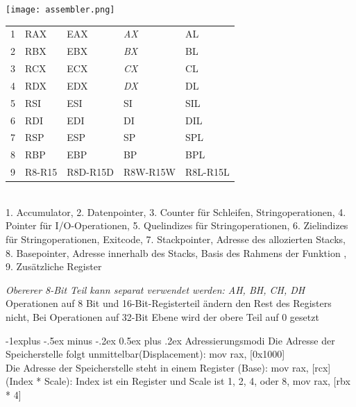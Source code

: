 \documentclass[10pt,landscape,a4paper]{article}
\makeatletter
\renewcommand{\subsection}{\@startsection{subsection}{2}{0mm}%
                                {-1explus -.5ex minus -.2ex}%
                                {0.5ex plus .2ex}%
                                {\normalfont\small\bfseries}}
\makeatother
\begin{document}
\begin{multicols*}{3}
\texttt{[image: assembler.png]}\\
\begin{tabular}{lllll}
1 & RAX     & \textcolor{reg1}{EAX}     & \textcolor{reg2}{\textit{AX}} & \textcolor{reg3}{AL}\\
2 & RBX     & \textcolor{reg1}{EBX}     & \textcolor{reg2}{\textit{BX}} & \textcolor{reg3}{BL}\\
3 & RCX     & \textcolor{reg1}{ECX}     & \textcolor{reg2}{\textit{CX}} & \textcolor{reg3}{CL}\\
4 & RDX     & \textcolor{reg1}{EDX}     & \textcolor{reg2}{\textit{DX}} & \textcolor{reg3}{DL}\\
5 & RSI     & \textcolor{reg1}{ESI}     & \textcolor{reg2}{SI} & \textcolor{reg3}{SIL}\\
6 & RDI     &  \textcolor{reg1}{EDI}    & \textcolor{reg2}{DI} & \textcolor{reg3}{DIL}\\
7 & RSP     & \textcolor{reg1}{ESP}     & \textcolor{reg2}{SP} & \textcolor{reg3}{SPL}\\
8 & RBP     & \textcolor{reg1}{EBP}     & \textcolor{reg2}{BP} &  \textcolor{reg3}{BPL}\\
9 & R8-R15  & \textcolor{reg1}{R8D-R15D} & \textcolor{reg2}{R8W-R15W} & \textcolor{reg3}{R8L-R15L}
\end{tabular}\\
1. Accumulator, 2. Datenpointer, 3. Counter für Schleifen, Stringoperationen, 4. Pointer für I/O-Operationen,
5. Quelindizes für Stringoperationen, 6. Zielindizes für Stringoperationen, Exitcode, 7. Stackpointer, Adresse des allozierten Stacks,
8. Basepointer, Adresse innerhalb des Stacks, Basis des Rahmens der Funktion , 9. Zusätzliche Register

\textcolor{reg2}{\textit{Obererer 8-Bit Teil kann separat verwendet werden: AH, BH, CH, DH}}\\
Operationen auf \textcolor{reg3}{8 Bit} und \textcolor{reg2}{16-Bit-Registerteil} ändern den Rest des Registers nicht,
Bei Operationen auf \textcolor{reg1}{32-Bit Ebene} wird der obere Teil auf 0 gesetzt

\subsection{Adressierungsmodi}
Die Adresse der Speicherstelle folgt unmittelbar(Displacement): mov rax, [0x1000]\\
Die Adresse der Speicherstelle steht in einem Register (Base): mov rax, [rcx]\\
(Index * Scale): Index ist ein Register und Scale ist 1, 2, 4, oder 8, mov rax, [rbx * 4]\\


\end{multicols*}
\end{document}

